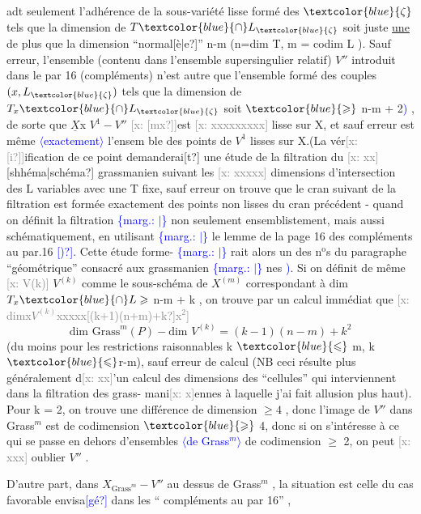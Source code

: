 \documentclass[11pt]{article}
\newcommand{\mspage}[1]{{\small\sffamily[p.\,#1]}}
\newcommand{\hand}[1]{\textcolor{blue}{#1}}
\newcommand{\inserted}[2][]{\textcolor{blue}{$\langle$#2$\rangle$}}
\newcommand{\margin}[1]{\textcolor{blue}{\{\textsf{marg.:} #1\}}}
\newcommand{\xout}[1]{\textcolor{gray}{[\textsf{x:} #1]}}
\newcommand{\uline}[1]{\underline{#1}}
\newcommand{\unsure}[1]{[#1?]}
\begin{document}
adt seulement l'adhérence de la sous-variété lisse formé des $\hand{\zeta}$ tels que
la dimension de $T\hand{\cap}L_{\hand{\zeta}}$ soit juste \uline{une} de plus que la dimension
``normal\unsure{è|e}'' n-m (n=dim T, m = codim L ). Sauf erreur, l'ensemble
(contenu dans l'ensemble supersingulier relatif) $V''$ introduit dans le par
16 (compléments) n'est autre que l'ensemble formé des couples
$(x,L_{\hand{\zeta}})$ tels que la dimension de $T_x\hand{\cap}L_{\hand{\zeta}}$ soit $\hand{\geqslant}$ n-m + 2\hand{)} , de sorte que
$\underline{X}$x $V^1 - V''$ \xout{\unsure{mx}}est \xout{xxxxxxxxx} lisse sur X, et sauf erreur est même \inserted{exactement} l'ensem
ble des points de $V^1$ lisses sur X.(La vér\xout{\unsure{i}}ification de ce point demanderai\unsure{t}
une étude de la filtration du \xout{xx} \unsure{shhéma|schéma} grassmanien suivant les \xout{xxxxx}
dimensions d'intersection des L variables avec une T fixe, sauf erreur on
trouve que le cran suivant de la filtration est formée exactement des
points non lisses du cran précédent - quand on définit la filtration
\margin{$|$} non seulement ensemblistement, mais aussi schématiquement, en utilisant
\margin{$|$} le lemme de la page 16 des compléments au par.16 \hand{\unsure{)}}. Cette étude forme-%
\margin{$|$} rait alors un des n$^{\text{o}}$s du paragraphe ``géométrique'' consacré aux grassmanien
\margin{$|$} nes \hand{)}. Si on définit de même \xout{V(k)} $V^{(k)}$ comme le sous-schéma de $X^{(m)}$
correspondant à dim $T_x\hand{\cap}L \geqslant$ n-m + k , on trouve par un calcul immédiat
que \xout{dimx$V^{(k)}$xxxxx\unsure{(k+1)(n+m)+k}x$^2$}
\[ \text{dim Grass}^m(P) - \text{dim } V^{(k)} = (k-1)(n-m) + k^2 \]
(du moins pour les restrictions raisonnables k $\hand{\leqslant}$ m, k $\hand{\leqslant}$r-m), sauf
erreur de calcul (NB ceci résulte plus généralement d\xout{xx}'un calcul des
dimensions des ``cellules'' qui interviennent dans la filtration des grass-%
mani\xout{x}ennes à laquelle j'ai fait allusion plus haut). Pour k = 2, on
trouve une différence de dimension $\geqslant 4$ , donc l'image de $V''$ dans Grass$^m$
est de codimension $\hand{\geqslant}$ 4, donc si on s'intéresse à ce qui se passe en dehors
d'ensembles \inserted[typed]{de Grass$^m$} de codimension $\geqslant$ 2, on peut \xout{xxx} oublier $V''$ .

D'autre part, dans $X_{\text{Grass}^m} - V''$ au dessus de Grass$^m$ , la situation
est celle du cas favorable envisa\hand{\unsure{gé}} dans les `` compléments au par 16'' ,

\mspage{72}
\end{document}

